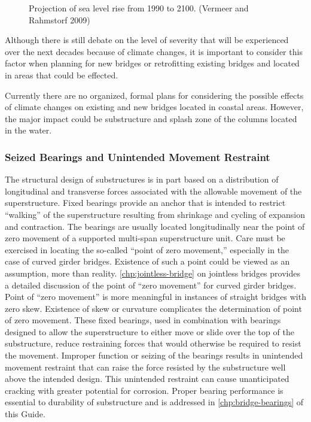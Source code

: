 \begin{figure}
  \caption{Projection of sea level rise from 1990 to 2100. (Vermeer and Rahmstorf 2009)}
  \label{fig:sea-level-rise-1990-2100}
\end{figure}

Although there is still debate on the level of severity that will be experienced over the next decades because of
climate changes, it is important to consider this factor when planning for new bridges or retrofitting existing bridges
and located in areas that could be effected.

Currently there are no organized, formal plans for considering the possible effects of climate changes on existing
and new bridges located in coastal areas. However, the major impact could be substructure and splash zone of the
columns located in the water.

\subsubsection{Seized Bearings and Unintended Movement Restraint}

The structural design of substructures is in part based on a distribution of longitudinal and transverse forces
associated with the allowable movement of the superstructure. Fixed bearings provide an anchor that is intended to restrict “walking” of the superstructure resulting from shrinkage and cycling of expansion and contraction. The
bearings are usually located longitudinally near the point of zero movement of a supported multi-span superstructure
unit. Care must be exercised in locating the so-called “point of zero movement,” especially in the case of curved
girder bridges. Existence of such a point could be viewed as an assumption, more than reality. \cref{chp:jointless-bridge} on jointless
bridges provides a detailed discussion of the point of “zero movement” for curved girder bridges. Point of “zero
movement” is more meaningful in instances of straight bridges with zero skew. Existence of skew or curvature
complicates the determination of point of zero movement. These fixed bearings, used in combination with bearings
designed to allow the superstructure to either move or slide over the top of the substructure, reduce restraining forces
that would otherwise be required to resist the movement. Improper function or seizing of the bearings results in
unintended movement restraint that can raise the force resisted by the substructure well above the intended design.
This unintended restraint can cause unanticipated cracking with greater potential for corrosion. Proper bearing
performance is essential to durability of substructure and is addressed in \cref{chp:bridge-bearings} of this Guide.

